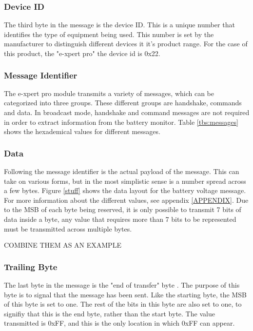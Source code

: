 \subsubsection{Device ID}

The third byte in the message is the device ID. This is a unique number that identifies the type of equipment being used. This number is set by the manufacturer to distinguish different devices it it's product range. For the case of this product, the "e-xpert pro" the device id is 0x22.

\subsubsection{Message Identifier}

The e-xpert pro module transmits a variety of messages, which can be categorized into three groups. These different groups are handshake, commands and data. In broadcast mode, handshake and command messages are not required in order to extract information from the battery monitor. Table \ref{tbs:messages} shows the hexademical values for different messages.

\subsubsection{Data}

Following the message identifier is the actual payload of the message. This can take on various forms, but in the most simplistic sense is a number spread across a few bytes. Figure \ref{stuff} shows the data layout for the battery voltage message. For more information about the different values, see appendix \ref{APPENDIX}.  Due to the MSB of each byte being reserved, it is only possible to transmit 7 bits of data inside a byte, any value that requires more than 7 bits to be represented must be transmitted across multiple bytes.  

COMBINE THEM AS AN EXAMPLE

\subsubsection{Trailing Byte}

The last byte in the message is the "end of transfer" byte \cite{e_xpert}. The purpose of this byte is to signal that the message has been sent. Like the starting byte, the MSB of this byte is set to one. The rest of the bits in this byte are also set to one, to signifiy that this is the end byte, rather than the start byte. The value transmitted is 0xFF, and this is the only location in which 0xFF can appear.


